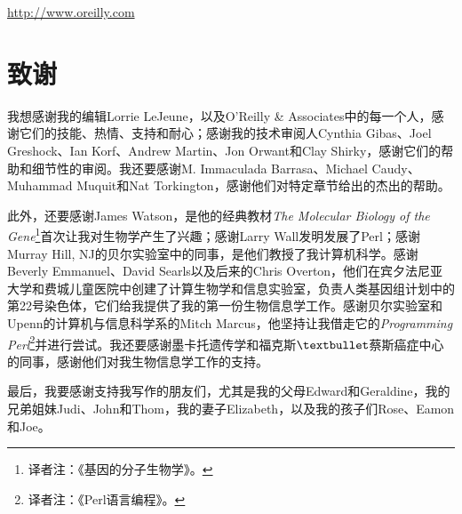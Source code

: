 \href{http://www.oreilly.com}{http://www.oreilly.com}

\section*{致谢}
我想感谢我的编辑Lorrie LeJeune，以及O'Reilly \& Associates中的每一个人，感谢它们的技能、热情、支持和耐心；感谢我的技术审阅人Cynthia Gibas、Joel Greshock、Ian Korf、Andrew Martin、Jon Orwant和Clay Shirky，感谢它们的帮助和细节性的审阅。我还要感谢M. Immaculada Barrasa、Michael Caudy、Muhammad Muquit和Nat Torkington，感谢他们对特定章节给出的杰出的帮助。

此外，还要感谢James Watson，是他的经典教材\textit{The Molecular Biology of the Gene}\footnote{译者注：《基因的分子生物学》。}首次让我对生物学产生了兴趣；感谢Larry Wall发明发展了Perl；感谢Murray Hill, NJ的贝尔实验室中的同事，是他们教授了我计算机科学。感谢Beverly Emmanuel、David Searls以及后来的Chris Overton，他们在宾夕法尼亚大学和费城儿童医院中创建了计算生物学和信息实验室，负责人类基因组计划中的第22号染色体，它们给我提供了我的第一份生物信息学工作。感谢贝尔实验室和Upenn的计算机与信息科学系的Mitch Marcus，他坚持让我借走它的\textit{Programming Perl}\footnote{译者注：《Perl语言编程》。}并进行尝试。我还要感谢墨卡托遗传学和福克斯$\textbullet$蔡斯癌症中心的同事，感谢他们对我生物信息学工作的支持。 

最后，我要感谢支持我写作的朋友们，尤其是我的父母Edward和Geraldine，我的兄弟姐妹Judi、John和Thom，我的妻子Elizabeth，以及我的孩子们Rose、Eamon和Joe。

\clearpage
\thispagestyle{empty}
